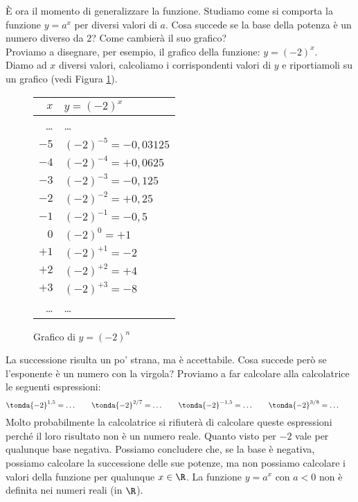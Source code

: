 È ora il momento di generalizzare la funzione. 
Studiamo come si comporta la funzione \(y=a^x\) per diversi valori di \(a\).
Cosa succede se la base della potenza è un numero diverso da 2? 
Come cambierà il suo grafico?\\[10pt]
\; Proviamo a disegnare, per esempio, il grafico della funzione: \(y=(-2)^x\).\\[4pt]
Diamo ad \(x\) diversi valori, calcoliamo i corrispondenti valori di \(y\) e 
riportiamoli su un grafico (vedi Figura \ref{fig:potmenodue0}).
\begin{figure}[h]
 \centering
 \begin{minipage}[]{.48\textwidth}
 \vspace*{.6cm}
  \begin{center}
   \begin{tabular}{r|l}
    $x$   & $y=(-2)^x$ \\
    \hline
    \dots & \dots \\
    $-5$ & $(-2)^{-5} = -0,03125$ \\
    $-4$ & $(-2)^{-4} = +0,0625$ \\
    $-3$ & $(-2)^{-3} = -0,125$ \\
    $-2$ & $(-2)^{-2} = +0,25$ \\
    $-1$ & $(-2)^{-1} = -0,5$ \\
    $0$ & $(-2)^{0} = +1$ \\
    $+1$ & $(-2)^{+1} = -2$ \\
    $+2$ & $(-2)^{+2} = +4$ \\
    $+3$ & $(-2)^{+3} = -8$ \\
    \dots & \dots \\
   \end{tabular}
 \vspace*{.6cm} \label{tab:potmenodue0}
  \end{center}
 \end{minipage}
\begin{minipage}[]{.48\textwidth}
\begin{center}
\begin{inaccessibleblock}
  \puntimenodue
  \caption{Grafico di $y=(-2)^n$} \label{fig:potmenodue0}
\end{inaccessibleblock}
\end{center}
\end{minipage}
\end{figure}
La successione risulta un po' strana, ma è accettabile. Cosa succede però se 
l'esponente è un numero con la virgola? Proviamo a far calcolare alla 
calcolatrice le seguenti espressioni:
\[\tonda{-2}^{1,5}= \dots \qquad \tonda{-2}^{2/7}= \dots \qquad 
 \tonda{-2}^{-1,5}= \dots \qquad \tonda{-2}^{3/8}= \dots \qquad 
\]
Molto probabilmente la calcolatrice si rifiuterà di calcolare queste 
espressioni perché il loro risultato non è un numero reale. 
Quanto visto per \(-2\) vale per qualunque base negativa.
Possiamo concludere che, se la base è negativa, possiamo calcolare la successione 
delle sue potenze, ma non possiamo calcolare i valori della funzione 
per qualunque \(x \in \R\). 
La funzione \(y=a^x \text{ con } a<0\) non è definita nei numeri reali 
(in \(\R\)).
